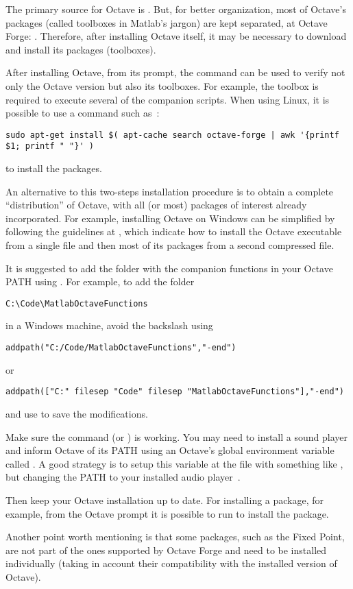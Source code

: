 The primary source for Octave is . But, for better organization, most of Octave's packages (called toolboxes in Matlab's jargon) are kept separated, at Octave Forge: .
Therefore, after installing Octave itself, it may be necessary to download and install its packages (toolboxes).

After installing Octave, from its prompt, the command  can be used to verify not only the Octave version but also its toolboxes. For example, the toolbox  is required to execute several of the companion scripts.
When using Linux, it is possible to use a command such as~:
\begin{lstlisting}
sudo apt-get install $( apt-cache search octave-forge | awk '{printf $1; printf " "}' )
\end{lstlisting}
to install the packages.

An alternative to this two-steps installation procedure is to obtain a complete ``distribution'' of Octave, with all (or most) packages of interest already incorporated.
For example, installing Octave on Windows can be simplified by following the guidelines at
, which indicate how to install the Octave executable from a single file and then most of its packages from a second compressed file.

It is suggested to add the folder with the companion functions in your Octave PATH using . For example, to add the folder
\begin{verbatim}
C:\Code\MatlabOctaveFunctions
\end{verbatim}
in a Windows machine, avoid the backslash using
\begin{verbatim}
addpath("C:/Code/MatlabOctaveFunctions","-end")
\end{verbatim}
or
\begin{verbatim}
addpath(["C:" filesep "Code" filesep "MatlabOctaveFunctions"],"-end")
\end{verbatim}
and use  to save the modifications.

Make sure the command  (or ) is working. You may need to install a sound player and inform Octave of its PATH using an Octave's global environment variable called . A good strategy is to setup this variable at the  file with something like , but changing the PATH to your installed audio player~.

Then keep your Octave installation up to date. For installing a package, for example, from the Octave prompt it is possible to run  to install the  package.

Another point worth mentioning is that some packages, such as the Fixed Point, are not part of the ones supported by Octave Forge and need to be installed individually (taking in account their compatibility with the installed version of Octave). 